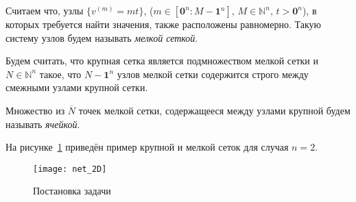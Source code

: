 Считаем что, узлы
$ \{v^{(m)}=mt\}$,  ($m\in [\mathbf{0}^n : M-\mathbf{1}^n]$,
$M\in \mathbb{N}^n$, $t>\mathbf{0}^n$), 
в которых требуется найти значения, 
также расположены
равномерно.
Такую  систему узлов %
будем называть
\textit{мелкой сеткой}.

Будем считать, что крупная сетка является подмножеством мелкой сетки и
$N\in\mathbb{N}^n$ такое, что $N-\mathbf{1}^n$ узлов мелкой сетки содержится строго между
смежными узлами крупной сетки.

Множество из $\overline{N}$ точек мелкой сетки, содержащееся между узлами крупной будем называть
\textit{ячейкой}.

На рисунке~\ref{fig:net_common} приведён пример крупной и мелкой сеток
для случая $n=2$.
\begin{figure}[h!]
  \centering
  \texttt{[image: net\_2D]}
  \caption{Постановка задачи}
  \label{fig:net_common}
\end{figure}



